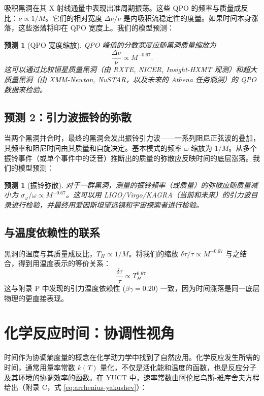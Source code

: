 \documentclass[12pt,a4paper]{article}
\newtheorem{prediction}[theorem]{预测}
\begin{document}
	吸积黑洞在其 X 射线通量中表现出准周期振荡。这些 QPO 的频率与质量成反比：\(\nu \propto 1/M\)。它们的相对宽度 \(\Delta\nu/\nu\) 是内吸积流稳定性的度量。如果时间本身涨落，这些涨落将印在 QPO 宽度上。我们的模型预测：
	\begin{prediction}[QPO 宽度缩放]
		QPO 峰值的分数宽度应随黑洞质量缩放为
		\begin{equation}
			\frac{\Delta\nu}{\nu} \propto M^{-0.67}.
		\end{equation}
		这可以通过比较恒星质量黑洞（由 RXTE, NICER, Insight-HXMT 观测）和超大质量黑洞（由 XMM-Newton, NuSTAR，以及未来的 Athena 任务观测）的 QPO 数据来检验。
	\end{prediction}
	
	\subsection{预测 2：引力波振铃的弥散}
	
	当两个黑洞并合时，最终的黑洞会发出振铃引力波——一系列阻尼正弦波的叠加，其频率和阻尼时间由其质量和自旋决定。基本模式的频率 \(\omega\) 缩放为 \(1/M\)。从多个振铃事件（或单个事件中的泛音）推断出的质量的弥散应反映时间的底层涨落。我们的模型预测：
	\begin{prediction}[振铃弥散]
		对于一群黑洞，测量的振铃频率（或质量）的弥散应随质量减小为 \(\sigma_{\omega}/\omega \propto M^{-0.67}\)。这可以用 LIGO/Virgo/KAGRA（当前和未来）的引力波目录进行检验，并最终用爱因斯坦望远镜和宇宙探索者进行检验。
	\end{prediction}
	
	\subsection{与温度依赖性的联系}
	
	黑洞的温度与其质量成反比，\(T_H \propto 1/M\)。将我们的缩放 \(\delta\tau/\tau \propto M^{-0.67}\) 与之结合，得到用温度表示的等价关系：
	\begin{equation}
		\frac{\delta\tau}{\tau} \propto T_H^{0.67}.
	\end{equation}
	这与附录 P 中发现的引力温度依赖性 (\(\beta\gamma = 0.20\)) 一致，因为时间涨落是同一底层物理的更直接表现。
	
	\section{化学反应时间：协调性视角}
	\label{sec:chemistry}
	
	时间作为协调熵度量的概念在化学动力学中找到了自然应用。化学反应发生所需的时间，通常用量率常数 \(k(T)\) 量化，不仅是活化能和温度的函数，也是反应分子及其环境的协调效率的函数。在 YUCT 中，速率常数由阿伦尼乌斯-雅库舍夫方程给出（附录 C，式 \ref{eq:arrhenius-yakushev}）：
	
\end{document}

